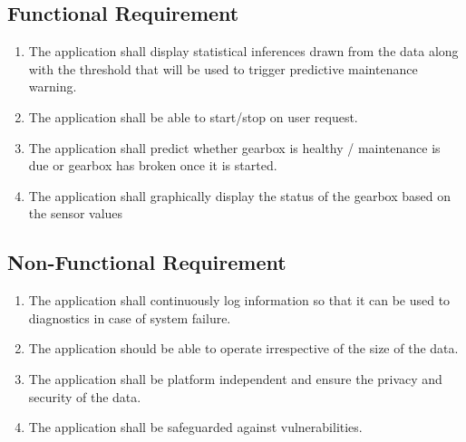 \label{sec:requirment}
\subsection{Functional Requirement}
\begin{enumerate}
	\item The application shall display statistical inferences drawn from the
	data along with the threshold that will be used to trigger predictive
	maintenance warning.
	\item The application shall be able to start/stop on user request.
	\item The application shall predict whether gearbox is healthy / maintenance is
	due or gearbox has broken once it is started.
	\item The application shall graphically display the status of the
	gearbox based on the sensor values
\end{enumerate}

\subsection{Non-Functional Requirement}
\begin{enumerate}
	\item The application shall continuously log information so that it can be used to
	diagnostics in case of system failure.
	\item The application should be able to operate irrespective of the size of the
	data.
	\item The application shall be platform independent and ensure the privacy and security
	of the data.
	\item The application shall be safeguarded against vulnerabilities.
\end{enumerate}